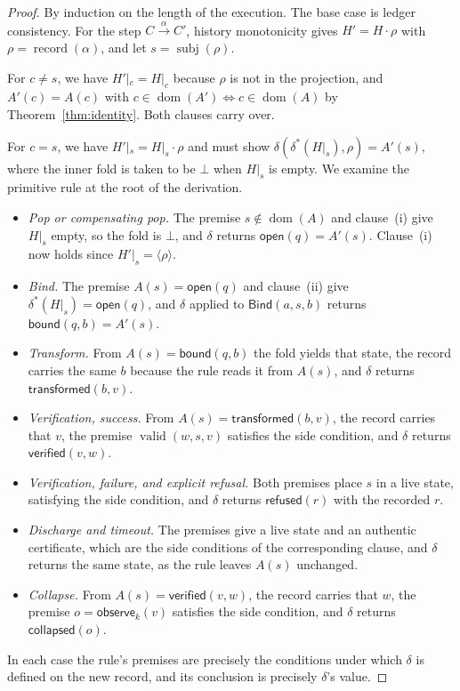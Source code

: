\documentclass[11pt,openany]{book}
\theoremstyle{remark}
\newcommand{\Bind}{\mathsf{Bind}}
\newcommand{\dom}{\operatorname{dom}}
\newcommand{\record}{\operatorname{record}}
\newcommand{\valid}{\operatorname{valid}}
\newcommand{\subj}{\operatorname{subj}}
\begin{document}
\begin{proof}
By induction on the length of the execution. The base case is ledger
consistency. For the step $C\xrightarrow{\alpha}C'$, history monotonicity
gives $H'=H\cdot\rho$ with $\rho=\record(\alpha)$, and let $s=\subj(\rho)$.

For $c\neq s$, we have
$H'|_c=H|_c$ because $\rho$ is not in the projection, and $A'(c)=A(c)$ with $c\in\dom(A')\iff c\in\dom(A)$ by
Theorem~\ref{thm:identity}. Both clauses carry over.

For $c=s$, we have $H'|_s=H|_s\cdot\rho$ and must show
$\delta(\delta^{*}(H|_s),\rho)=A'(s)$, where the inner fold is taken to be
$\bot$ when $H|_s$ is empty. We examine the primitive rule at the root of
the derivation.
\begin{itemize}[leftmargin=1.5em]
\item \emph{Pop or compensating pop.} The premise $s\notin\dom(A)$ and
clause~(i) give $H|_s$ empty, so the fold is $\bot$, and $\delta$ returns
$\mathsf{open}(q)=A'(s)$. Clause~(i) now holds since $H'|_s=\langle\rho\rangle$.
\item \emph{Bind.} The premise $A(s)=\mathsf{open}(q)$ and clause~(ii)
give $\delta^{*}(H|_s)=\mathsf{open}(q)$, and $\delta$ applied to
$\Bind(a,s,b)$ returns $\mathsf{bound}(q,b)=A'(s)$.
\item \emph{Transform.} From $A(s)=\mathsf{bound}(q,b)$ the fold yields
that state, the record carries the same $b$ because the rule reads it
from $A(s)$, and $\delta$ returns $\mathsf{transformed}(b,v)$.
\item \emph{Verification, success.} From
$A(s)=\mathsf{transformed}(b,v)$, the record carries that $v$, the premise
$\valid(w,s,v)$ satisfies the side condition, and $\delta$ returns
$\mathsf{verified}(v,w)$.
\item \emph{Verification, failure, and explicit refusal.} Both premises
place $s$ in a live state, satisfying the side condition, and $\delta$
returns $\mathsf{refused}(r)$ with the recorded $r$.
\item \emph{Discharge and timeout.} The premises give a live state and an
authentic certificate, which are the side conditions of the corresponding
clause, and $\delta$ returns the same state, as the rule leaves $A(s)$
unchanged.
\item \emph{Collapse.} From $A(s)=\mathsf{verified}(v,w)$, the record
carries that $w$, the premise $o=\mathsf{observe}_k(v)$ satisfies the
side condition, and $\delta$ returns $\mathsf{collapsed}(o)$.
\end{itemize}
In each case the rule's premises are precisely the conditions under which
$\delta$ is defined on the new record, and its conclusion is precisely
$\delta$'s value.
\end{proof}
\end{document}
